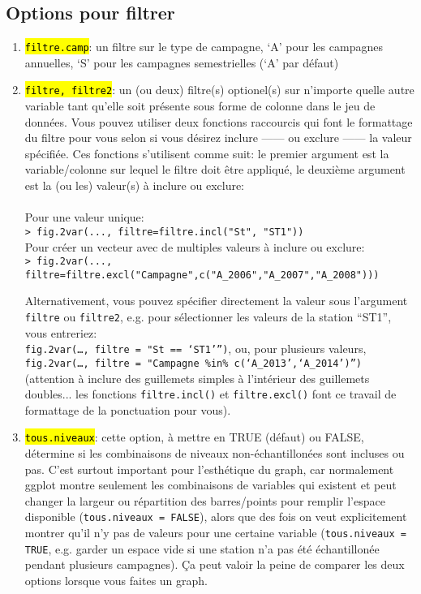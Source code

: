 \documentclass[12pt]{article}
\begin{document}
\subsection{Options pour filtrer}
\begin{enumerate}

\item \hl{\texttt{filtre.camp}}: un filtre sur le type de campagne, `A' pour les campagnes annuelles, `S' pour les campagnes semestrielles (`A' par défaut)

\item \hl{\texttt{filtre, filtre2}}: un (ou deux) filtre(s) optionel(s) sur n'importe quelle autre variable tant qu'elle soit présente sous forme de colonne dans le jeu de données. Vous pouvez utiliser deux fonctions raccourcis qui font le formattage du filtre pour vous selon si vous désirez inclure ------ ou exclure ------ la valeur spécifiée. Ces fonctions s'utilisent comme suit: le premier argument est la variable/colonne sur lequel le filtre doit être appliqué, le deuxième argument est la (ou les) valeur(s) à inclure ou exclure: \\
\\
Pour une valeur unique:\\
\footnotesize{\texttt{> fig.2var(..., filtre=filtre.incl("St", "ST1"))}}\\

Pour créer un vecteur avec de multiples valeurs à inclure ou exclure:\\
{\footnotesize\texttt{> fig.2var(..., filtre=filtre.excl("Campagne",c("A\_2006","A\_2007","A\_2008")))}}
 
Alternativement, vous pouvez spécifier directement la valeur sous l'argument \texttt{filtre} ou \texttt{filtre2}, e.g. pour sélectionner les valeurs de la station “ST1”, vous entreriez:\\ \texttt{fig.2var(…, filtre = "St == ‘ST1’”)}, ou, pour plusieurs valeurs,\\ \texttt{fig.2var(…, filtre = "Campagne \%in\% c(‘A\_2013’,`A\_2014')”)} (attention à inclure des guillemets simples à l'intérieur des guillemets doubles... les fonctions \texttt{filtre.incl()} et \texttt{filtre.excl()} font ce travail de formattage de la ponctuation pour vous).

\item \hl{\texttt{tous.niveaux}}: cette option, à mettre en TRUE (défaut) ou FALSE, détermine si les combinaisons de niveaux non-échantillonées sont incluses ou pas. C'est surtout important pour l’esthétique du graph, car normalement ggplot montre seulement les combinaisons de variables qui existent et peut changer la largeur ou répartition des barres/points pour remplir l’espace disponible (\texttt{tous.niveaux = FALSE}), alors que des fois on veut explicitement montrer qu’il n’y pas de valeurs pour une certaine variable (\texttt{tous.niveaux = TRUE}, e.g. garder un espace vide si une station n’a pas été échantillonée pendant plusieurs campagnes). Ça peut valoir la peine de comparer les deux options lorsque vous faites un graph.


\end{enumerate}
\end{document}
